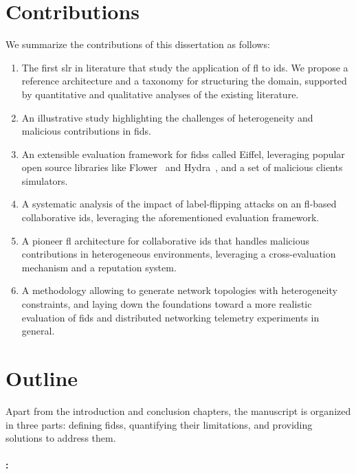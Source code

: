 \section{Contributions\label{sec:intro.contributions}}

We summarize the contributions of this dissertation as follows:

\begin{enumerate}
  \item The first \gls{slr} in literature that study the application of \gls{fl} to \gls{ids}. We propose a reference architecture and a taxonomy for structuring the domain, supported by quantitative and qualitative analyses of the existing literature.
  \item An illustrative study highlighting the challenges of heterogeneity and malicious contributions in \gls{fids}.
  \item An extensible evaluation framework for \glspl{fids} called Eiffel, leveraging popular open source libraries like Flower~\cite{beutel_Flowerfriendlyfederated_2020} and Hydra~\cite{Hydra}, and a set of malicious clients simulators. 
  \item A systematic analysis of the impact of label-flipping attacks on an \gls{fl}-based collaborative \gls{ids}, leveraging the aforementioned evaluation framework.
  \item A pioneer \gls{fl} architecture for collaborative \gls{ids} that handles malicious contributions in heterogeneous environments, leveraging a cross-evaluation mechanism and a reputation system.
  \item A methodology allowing to generate network topologies with heterogeneity constraints, and laying down the foundations toward a more realistic evaluation of \gls{fids} and distributed networking telemetry experiments in general.
\end{enumerate}


\section{Outline\label{sec:intro.outline}}

Apart from the introduction and conclusion chapters, the manuscript is organized in three parts: defining \glspl{fids}, quantifying their limitations, and providing solutions to address them.

\paragraph{:}

